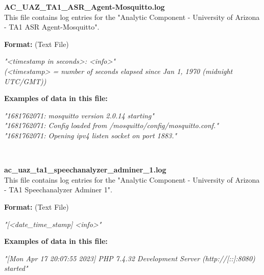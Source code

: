 \begin{description}
\begin{addmargin}[0em]{0em}
    \label{AC_UAZ_TA1_ASR_Agent-Mosquitto.log}
    \begin{addmargin}[1em]{0em} %
        \textbf{AC\_UAZ\_TA1\_ASR\_Agent-Mosquitto.log}\\
        This file contains log entries for the "Analytic Component - University of Arizona - TA1 ASR Agent-Mosquitto".
        \begin{addmargin}[1em]{0em}
            \textbf{Format:} (Text File)
            \begin{addmargin}[1em]{0em}
                \textit{"<timestamp in seconds>: <info>"\\
                (<timestamp> = number of seconds elapsed since Jan 1, 1970 (midnight UTC/GMT))}
            \end{addmargin}
        \end{addmargin}
        \begin{addmargin}[1em]{0em}
            \textbf{Examples of data in this file:}
            \begin{addmargin}[1em]{0em}\textit{"1681762071: mosquitto version 2.0.14 starting"\\
                "1681762071: Config loaded from /mosquitto/config/mosquitto.conf."\\
                "1681762071: Opening ipv4 listen socket on port 1883."}
            \end{addmargin}
        \end{addmargin}
    \end{addmargin} %
    \textbf{\\}

    \label{ac_uaz_ta1_speechanalyzer_adminer_1.log}
    \begin{addmargin}[1em]{0em} %
        \textbf{ac\_uaz\_ta1\_speechanalyzer\_adminer\_1.log}\\
        This file contains log entries for the "Analytic Component - University of Arizona - TA1 Speechanalyzer Adminer 1".
        \begin{addmargin}[1em]{0em}
            \textbf{Format:} (Text File)
            \begin{addmargin}[1em]{0em}
                \textit{"[<date\_time\_stamp] <info>"}
            \end{addmargin}
        \end{addmargin}
        \begin{addmargin}[1em]{0em}
            \textbf{Examples of data in this file:}
            \begin{addmargin}[1em]{0em}\textit{"[Mon Apr 17 20:07:55 2023] PHP 7.4.32 Development Server (http://[::]:8080) started"}
            \end{addmargin}
        \end{addmargin}
    \end{addmargin} %
    \textbf{\\}


\end{addmargin}
\end{description}
